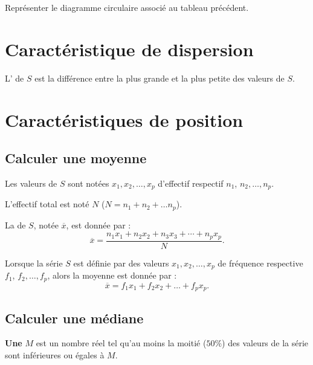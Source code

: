 \documentclass[french,12pt]{report}
\begin{document}
Représenter le diagramme circulaire associé au tableau précédent.

\newpage

\section{Caractéristique de dispersion}
\begin{Defi}{}
    L' de $S$ est la différence entre la plus grande et la plus petite des valeurs de $S$.
\end{Defi}


\section{Caractéristiques de position}




\subsection{Calculer une moyenne}

\begin{Defi}{}
    Les valeurs de $S$ sont notées $x_1, x_2, \ldots, x_p$ d'effectif respectif $n_1$, $n_2, \dots, n_p$.\par
    L'effectif total est noté $N$ ($N = n_1 + n_2 + \dots n_p$).\par
    La  de $S$, notée $\overline{x}$, est donnée par :
    \[\overline{x} = \frac{n_1x_1 + n_2x_2 + n_3x_3 + \cdots + n_px_p}{N}.\]

    Lorsque la série $S$ est définie par des valeurs $x_1, x_2, \ldots, x_p$ de fréquence respective $f_1$, $f_2, \dots, f_p$, alors la moyenne est donnée par :
    \[\overline x = f_1x_1 + f_2x_2 + \dots + f_px_p.\]
\end{Defi}


\subsection{Calculer une médiane}
\begin{Defi}{}
    \textbf{Une}  $M$ est un nombre réel tel qu'au moins la moitié ($50\%$) des valeurs de la série sont inférieures ou égales à $M$.
\end{Defi}


\begin{center}
\end{center}
\end{document}

